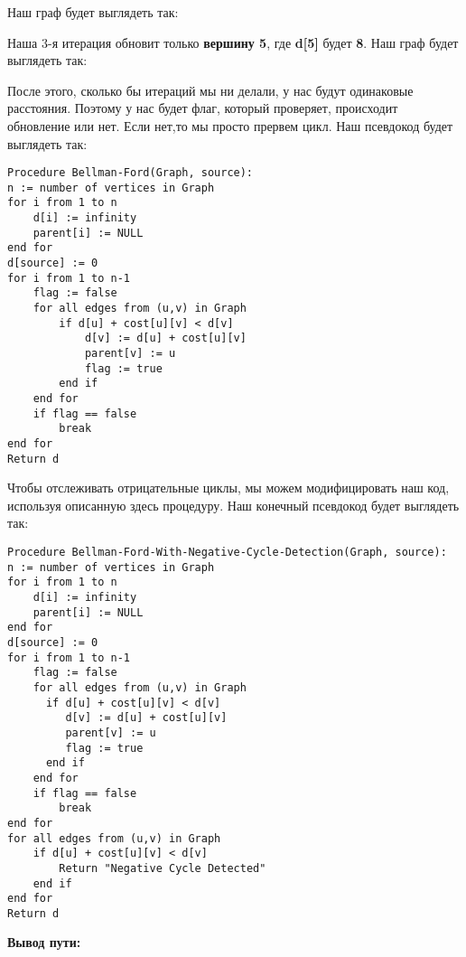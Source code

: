 Наш граф будет выглядеть так:

\begin{center}
\end{center}

Наша 3-я итерация обновит только \textbf{вершину 5}, где \textbf{d[5]} будет \textbf{8}. Наш граф будет выглядеть так:

\begin{center}
\end{center}

После этого, сколько бы итераций мы ни делали, у нас будут одинаковые расстояния. Поэтому у нас будет флаг, который проверяет, происходит обновление или нет. Если нет,то мы просто прервем цикл. Наш псевдокод будет выглядеть так:

\begin{tcolorbox}
\begin{verbatim}
Procedure Bellman-Ford(Graph, source):
n := number of vertices in Graph
for i from 1 to n
	d[i] := infinity
	parent[i] := NULL
end for
d[source] := 0
for i from 1 to n-1
	flag := false
	for all edges from (u,v) in Graph
		if d[u] + cost[u][v] < d[v]
			d[v] := d[u] + cost[u][v]
			parent[v] := u
			flag := true
		end if
	end for
	if flag == false
		break
end for
Return d
\end{verbatim}
\end{tcolorbox}

Чтобы отслеживать отрицательные циклы, мы можем модифицировать наш код, используя описанную здесь процедуру. Наш конечный псевдокод будет выглядеть так:

\begin{tcolorbox}
\begin{verbatim}
Procedure Bellman-Ford-With-Negative-Cycle-Detection(Graph, source):
n := number of vertices in Graph
for i from 1 to n
	d[i] := infinity
	parent[i] := NULL
end for
d[source] := 0
for i from 1 to n-1
	flag := false
	for all edges from (u,v) in Graph
	  if d[u] + cost[u][v] < d[v]
		 d[v] := d[u] + cost[u][v]
		 parent[v] := u
		 flag := true
	  end if
	end for
	if flag == false
		break
end for
for all edges from (u,v) in Graph
	if d[u] + cost[u][v] < d[v]
		Return "Negative Cycle Detected"
	end if
end for
Return d
\end{verbatim}
\end{tcolorbox}

\textbf{Вывод пути:}

\vspace{\baselineskip}

